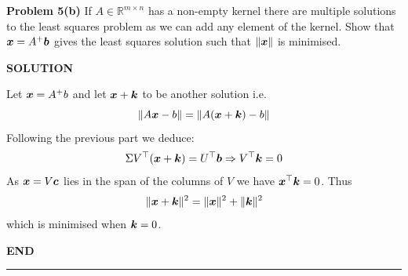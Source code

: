 \documentclass[12pt,a4paper]{article}
\def\bbR{ {\mathbb R} }
\def\x{ {\vc x} }
\def\b{ {\vc b} }
\def\c{ {\vc c} }
\def\k{ {\vc k} }
\begin{document}
\textbf{Problem 5(b)} If $A \ensuremath{\in} \ensuremath{\bbR}^{m \ensuremath{\times} n}$ has a non-empty kernel there are multiple solutions to the least squares problem as  we can add any element of the kernel. Show that $\ensuremath{\bm{\x}} = A^+ \ensuremath{\bm{\b}}$ gives the least squares solution such that $\| \ensuremath{\bm{\x}} \|$ is minimised.

\textbf{SOLUTION}

Let $\ensuremath{\bm{\x}}     =A^+b$ and let $\ensuremath{\bm{\x}} + \ensuremath{\bm{\k}}$ to be another solution i.e.
\[
\|A\ensuremath{\bm{\x}} - b \| = \|A (\ensuremath{\bm{\x}} +\ensuremath{\bm{\k}}) - b \|
\]
Following the previous part we deduce:
\[
\ensuremath{\Sigma} V^\ensuremath{\top} (\ensuremath{\bm{\x}} +\ensuremath{\bm{\k}}) = U^\ensuremath{\top} \ensuremath{\bm{\b}} \ensuremath{\Rightarrow} V^\ensuremath{\top} \ensuremath{\bm{\k}} = 0
\]
As $\ensuremath{\bm{\x}} = V \ensuremath{\bm{\c}}$ lies in the span of the columns of $V$ we have $\ensuremath{\bm{\x}}^\ensuremath{\top} \ensuremath{\bm{\k}} = 0$. Thus
\[
\| \ensuremath{\bm{\x}} + \ensuremath{\bm{\k}} \|^2 = \| \ensuremath{\bm{\x}} \|^2 + \| \ensuremath{\bm{\k}} \|^2
\]
which is minimised when $\ensuremath{\bm{\k}} = 0$.

\textbf{END}

\rule{\textwidth}{1pt}
\end{document}
